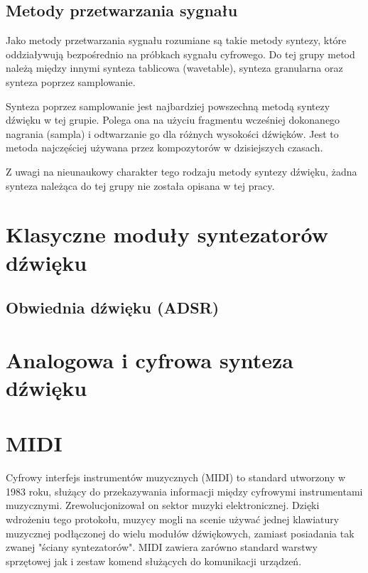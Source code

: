 \subsection{Metody przetwarzania sygnału}
Jako metody przetwarzania sygnału rozumiane są takie metody syntezy, które oddziaływują bezpośrednio na próbkach sygnału cyfrowego. Do tej grupy metod należą między innymi synteza tablicowa (wavetable), synteza granularna oraz synteza poprzez samplowanie.

Synteza poprzez samplowanie jest najbardziej powszechną metodą syntezy dźwięku w tej grupie. Polega ona na użyciu fragmentu wcześniej dokonanego nagrania (sampla) i odtwarzanie go dla różnych wysokości dźwięków. Jest to metoda najczęściej używana przez kompozytorów w dzisiejszych czasach.

Z uwagi na nieunaukowy charakter tego rodzaju metody syntezy dźwięku, żadna synteza należąca do tej grupy nie została opisana w tej pracy.



\section{Klasyczne moduły syntezatorów dźwięku}


\subsection{Obwiednia dźwięku (ADSR)}




\section{Analogowa i cyfrowa synteza dźwięku}




\section{MIDI}
Cyfrowy interfejs instrumentów muzycznych (MIDI) to standard utworzony w 1983 roku, służący do przekazywania informacji między cyfrowymi instrumentami muzycznymi. Zrewolucjonizował on sektor muzyki elektronicznej. Dzięki wdrożeniu tego protokołu, muzycy mogli na scenie używać jednej klawiatury muzycznej podłączonej do wielu modułów dźwiękowych, zamiast posiadania tak zwanej "ściany syntezatorów". MIDI zawiera zarówno standard warstwy sprzętowej jak i zestaw komend służących do komunikacji urządzeń.

